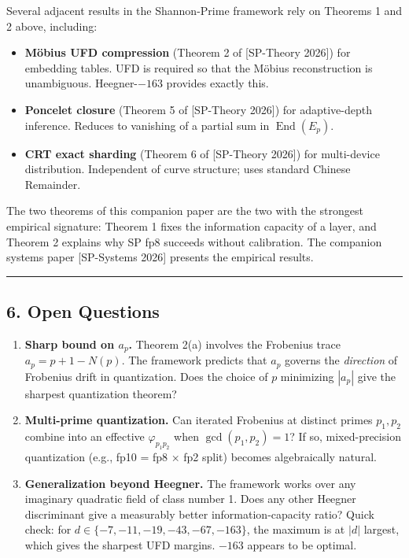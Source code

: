 \documentclass[
  11pt,
]{article}
\providecommand{\tightlist}{%
  \setlength{\itemsep}{0pt}\setlength{\parskip}{0pt}}
\begin{document}
Several adjacent results in the Shannon-Prime framework rely on Theorems
1 and 2 above, including:

\begin{itemize}
\tightlist
\item
  \textbf{Möbius UFD compression} (Theorem 2 of {[}SP-Theory 2026{]})
  for embedding tables. UFD is required so that the Möbius
  reconstruction is unambiguous. Heegner-\(-163\) provides exactly this.
\item
  \textbf{Poncelet closure} (Theorem 5 of {[}SP-Theory 2026{]}) for
  adaptive-depth inference. Reduces to vanishing of a partial sum in
  \(\operatorname{End}(E_p)\).
\item
  \textbf{CRT exact sharding} (Theorem 6 of {[}SP-Theory 2026{]}) for
  multi-device distribution. Independent of curve structure; uses
  standard Chinese Remainder.
\end{itemize}

The two theorems of this companion paper are the two with the strongest
empirical signature: Theorem 1 fixes the information capacity of a
layer, and Theorem 2 explains why SP fp8 succeeds without calibration.
The companion systems paper {[}SP-Systems 2026{]} presents the empirical
results.

\begin{center}\rule{0.5\linewidth}{0.5pt}\end{center}

\hypertarget{open-questions}{%
\subsection{6. Open Questions}\label{open-questions}}

\begin{enumerate}
\def\labelenumi{\arabic{enumi}.}
\item
  \textbf{Sharp bound on \(a_p\).} Theorem 2(a) involves the Frobenius
  trace \(a_p = p + 1 - N(p)\). The framework predicts that \(a_p\)
  governs the \emph{direction} of Frobenius drift in quantization. Does
  the choice of \(p\) minimizing \(|a_p|\) give the sharpest
  quantization theorem?
\item
  \textbf{Multi-prime quantization.} Can iterated Frobenius at distinct
  primes \(p_1, p_2\) combine into an effective \(\varphi_{p_1 p_2}\)
  when \(\gcd(p_1, p_2) = 1\)? If so, mixed-precision quantization
  (e.g., fp10 = fp8 × fp2 split) becomes algebraically natural.
\item
  \textbf{Generalization beyond Heegner.} The framework works over any
  imaginary quadratic field of class number 1. Does any other Heegner
  discriminant give a measurably better information-capacity ratio?
  Quick check: for \(d \in \{-7, -11, -19, -43, -67, -163\}\), the
  maximum is at \(|d|\) largest, which gives the sharpest UFD margins.
  \(-163\) appears to be optimal.
\end{enumerate}
\end{document}
